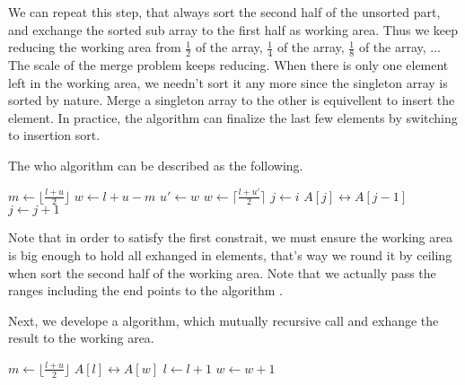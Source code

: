 \documentclass{article}
\begin{document}
We can repeat this step, that always sort the second half of the unsorted part, and exchange
the sorted sub array to the first half as working area. Thus we keep reducing the working area 
from $\frac{1}{2}$ of the array, $\frac{1}{4}$
of the array, $\frac{1}{8}$ of the array, ... The scale of the merge problem keeps reducing.
When there is only one element left in the working area, we needn't sort it any more since
the singleton array is sorted by nature. Merge a singleton array to the other is equivellent
to insert the element. In practice, the algorithm can finalize the last few 
elements by switching to insertion sort.

The who algorithm can be described as the following.

\begin{algorithmic}
    \State $m \gets \lfloor \frac{l + u}{2} \rfloor$
    \State $w \gets l + u - m$
    \State {} 
      \State $u' \gets w$
      \State $w \gets \lceil \frac{l + u'}{2} \rceil$ 
      \State {} 
      \State {}
    \EndWhile
     
      \State $j \gets i$
        \State {} $A[j] \leftrightarrow A[j-1]$
        \State $j \gets j + 1$
      \EndWhile
    \EndFor
  \EndIf
\EndProcedure
\end{algorithmic}

Note that in order to satisfy the first constrait, we must ensure the working area is big enough to hold
all exhanged in elements, that's way we round it by ceiling when sort the second half of the working area.
Note that we actually pass the ranges including the end points to the algorithm .

Next, we develope a  algorithm, which mutually recursive call  and exhange the result
to the working area.

\begin{algorithmic}
    \State $m \gets \lfloor \frac{l + u}{2} \rfloor$
    \State {}
    \State {}
    \State {}
  \Else {}
      \State {} $A[l] \leftrightarrow A[w]$
      \State $l \gets l + 1$
      \State $w \gets w + 1$
    \EndWhile
  \EndIf
\EndProcedure
\end{algorithmic}
\end{document}

